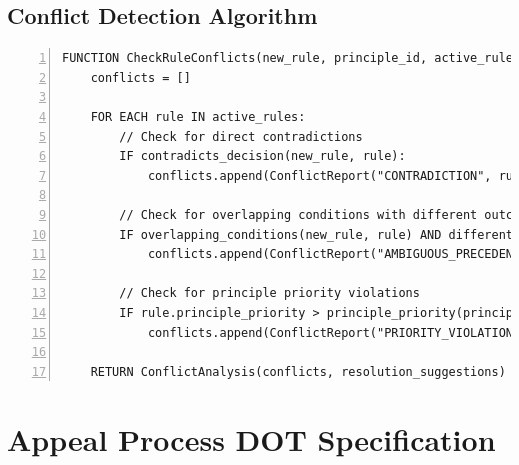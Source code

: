 \documentclass[sigconf,natbib]{acmart}
\begin{document}
\subsection{Conflict Detection Algorithm}
\label{alg:conflict_detect_detailed}
\begin{lstlisting}[language=text, caption=Conflict detection algorithm between Rego rules., label=lst:conflict_detect_detailed, numbers=left, basicstyle=\ttfamily\scriptsize]
FUNCTION CheckRuleConflicts(new_rule, principle_id, active_rules):
    conflicts = []

    FOR EACH rule IN active_rules:
        // Check for direct contradictions
        IF contradicts_decision(new_rule, rule):
            conflicts.append(ConflictReport("CONTRADICTION", rule.id, severity="HIGH"))

        // Check for overlapping conditions with different outcomes
        IF overlapping_conditions(new_rule, rule) AND different_outcomes(new_rule, rule):
            conflicts.append(ConflictReport("AMBIGUOUS_PRECEDENCE", rule.id, severity="MEDIUM"))

        // Check for principle priority violations
        IF rule.principle_priority > principle_priority(principle_id) AND blocks_execution(rule, new_rule):
            conflicts.append(ConflictReport("PRIORITY_VIOLATION", rule.id, severity="HIGH"))

    RETURN ConflictAnalysis(conflicts, resolution_suggestions)
\end{lstlisting}

\section{Appeal Process DOT Specification}
\label{app:appeal_dot_code}
\end{document}
